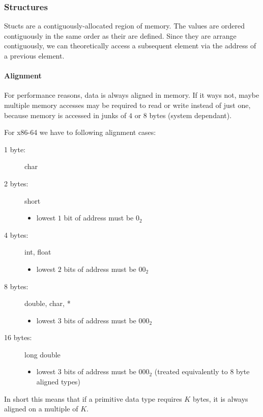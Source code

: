 \subsubsection{Structures}
Stucts are a contiguously-allocated region of memory. The values are ordered contiguously in the same order as their are defined. Since they are arrange contiguously, we can theoretically access a subsequent element via the address of a previous element.

\paragraph{Alignment}
For performance reasons, data is always aligned in memory. If it ways not, maybe multiple memory accesses may be required to read or write instead of just one, because memory is accessed in junks of $4$ or $8$ bytes (system dependant).

For x86-64 we have to following alignment cases:
\begin{description}
    \item[1 byte:] char
    \item[2 bytes:] short
        \begin{itemize}
            \item lowest $1$ bit of address must be $0_2$
        \end{itemize}
    \item[4 bytes:] int, float
        \begin{itemize}
            \item lowest $2$ bits of address must be $00_2$
        \end{itemize}
    \item[8 bytes:] double, char, *
        \begin{itemize}
            \item lowest $3$ bits of address must be $000_2$
        \end{itemize}
    \item[16 bytes:] long double
        \begin{itemize}
            \item lowest $3$ bits of address must be $000_2$ (treated equivalently to $8$ byte aligned types)
        \end{itemize}
\end{description}

In short this means that if a primitive data type requires $K$ bytes, it is always aligned on a multiple of $K$.

